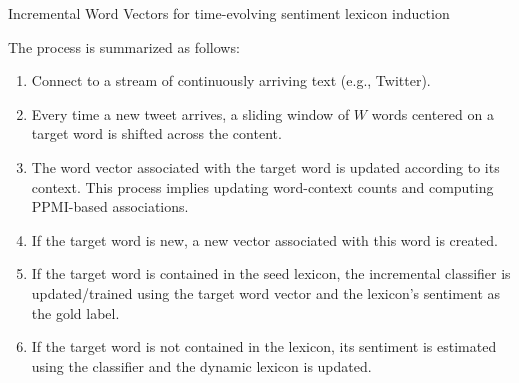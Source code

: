 \documentclass[handout]{beamer}
\begin{document}
\begin{frame}{Incremental Word Vectors for time-evolving sentiment lexicon induction}
\begin{scriptsize}

 The process is summarized as follows:

 \begin{enumerate}
    \item Connect to a stream of continuously arriving text (e.g., Twitter).
    \item Every time a new tweet arrives, a sliding window of $W$ words centered on a target word is shifted across the content.
    \item The word vector associated with the target word is updated according to its context. This process implies updating  word-context counts and computing PPMI-based associations.
    \item If the target word is new, a new vector associated with this word is created.
    \item If the target word is contained in the seed lexicon, the incremental classifier is updated/trained using the target word vector and the lexicon's sentiment as the gold label.
    \item If the target word is not contained in the lexicon, its sentiment is estimated using the classifier and the dynamic lexicon is updated.
\end{enumerate}


\end{scriptsize}
\end{frame}
\end{document}

